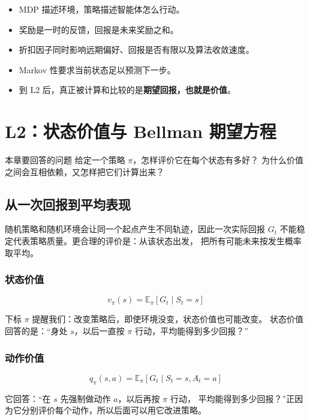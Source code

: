 \documentclass[11pt,a4paper,fontset=fandol]{ctexart}
\newcommand{\E}{\mathbb{E}}
\newcommand{\vpi}{v_{\pi}}
\newcommand{\qpi}{q_{\pi}}
\begin{document}
\begin{memorybox}
\begin{itemize}
  \item MDP 描述环境，策略描述智能体怎么行动。
  \item 奖励是一时的反馈，回报是未来奖励之和。
  \item 折扣因子同时影响远期偏好、回报是否有限以及算法收敛速度。
  \item Markov 性要求当前状态足以预测下一步。
  \item 到 L2 后，真正被计算和比较的是\textbf{期望回报，也就是价值}。
\end{itemize}
\end{memorybox}

\clearpage
\section{L2：状态价值与 Bellman 期望方程}

\begin{goalbox}{本章要回答的问题}
给定一个策略 \(\pi\)，怎样评价它在每个状态有多好？
为什么价值之间会互相依赖，又怎样把它们计算出来？
\end{goalbox}

\subsection{从一次回报到平均表现}

随机策略和随机环境会让同一个起点产生不同轨迹，因此一次实际回报
\(G_t\) 不能稳定代表策略质量。更合理的评价是：从该状态出发，
把所有可能未来按发生概率取平均。

\subsubsection{状态价值}

\[
\boxed{
\vpi(s)=\E_{\pi}[G_t\mid S_t=s]
}
\]

下标 \(\pi\) 提醒我们：改变策略后，即使环境没变，状态价值也可能改变。
状态价值回答的是：“身处 \(s\)，以后一直按 \(\pi\) 行动，平均能得到多少回报？”

\subsubsection{动作价值}

\[
\boxed{
\qpi(s,a)=\E_{\pi}[G_t\mid S_t=s,A_t=a]
}
\]

它回答：“在 \(s\) 先强制做动作 \(a\)，以后再按 \(\pi\) 行动，
平均能得到多少回报？”正因为它分别评价每个动作，所以后面可以用它改进策略。
\end{document}
